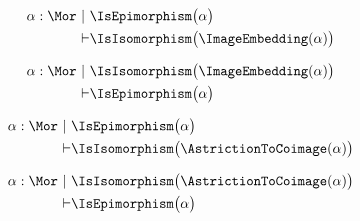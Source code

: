 

\begin{sequent}
\begin{align*}
  \alpha:\Mor~|~ & \IsEpimorphism\big( \alpha \big) \\
  \vdash &\IsIsomorphism\big( \ImageEmbedding( \alpha ) \big)
\end{align*}
\end{sequent}

\begin{sequent}
\begin{align*}
  \alpha:\Mor~|~ & \IsIsomorphism\big( \ImageEmbedding( \alpha ) \big) \\
  \vdash &\IsEpimorphism\big( \alpha \big)
\end{align*}
\end{sequent}

\begin{sequent}
\begin{align*}
  \alpha:\Mor~|~ & \IsEpimorphism\big( \alpha \big) \\
  \vdash &\IsIsomorphism\big( \AstrictionToCoimage( \alpha ) \big)
\end{align*}
\end{sequent}

\begin{sequent}
\begin{align*}
  \alpha:\Mor~|~ & \IsIsomorphism\big( \AstrictionToCoimage( \alpha ) \big) \\
  \vdash &\IsEpimorphism\big( \alpha \big)
\end{align*}
\end{sequent}

